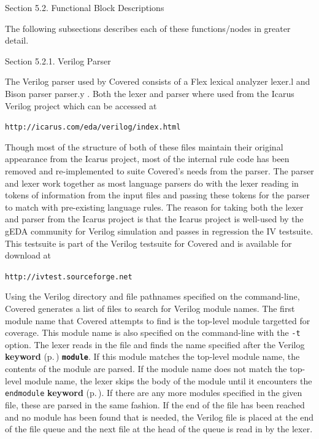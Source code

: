 \begin{Desc}
\item[Section 5.2.  Functional Block Descriptions]\par
 The following subsections describes each of these functions/nodes in greater detail.\end{Desc}
\begin{Desc}
\item[Section 5.2.1.  Verilog Parser]\par
 The Verilog parser used by Covered consists of a Flex lexical analyzer lexer.l and  Bison parser parser.y . Both the lexer and parser where used from the Icarus Verilog project which can be accessed at

 {\tt http://icarus.com/eda/verilog/index.html}

 Though most of the structure of both of these files maintain their original appearance from the Icarus project, most of the internal rule code has been removed and re-implemented to suite Covered's needs from the parser. The parser and lexer work together as most language parsers do with the lexer reading in tokens of information from the input files and passing these tokens for the parser to match with pre-existing language rules. The reason for taking both the lexer and parser from the Icarus project is that the Icarus project is well-used by the g\-EDA community for Verilog simulation and passes in regression the IV testsuite. This testsuite is part of the Verilog testsuite for Covered and is available for download at

 {\tt http://ivtest.sourceforge.net}

 Using the Verilog directory and file pathnames specified on the command-line, Covered generates a list of files to search for Verilog module names. The first module name that Covered attempts to find is the top-level module targetted for coverage. This module name is also specified on the command-line with the {\tt -t} option. The lexer reads in the file and finds the name specified after the Verilog {\bf keyword} {\rm (p.\,\pageref{structkeyword})} {\tt {\bf module}}. If this module matches the top-level module name, the contents of the module are parsed. If the module name does not match the top-level module name, the lexer skips the body of the module until it  encounters the {\tt endmodule} {\bf keyword} {\rm (p.\,\pageref{structkeyword})}. If there are any more modules specified in the given file, these are parsed in the same fashion. If the end of the file has been reached and no module has been found that is needed, the Verilog file is placed at the end of the file  queue and the next file at the head of the queue is read in by the lexer.


\end{Desc}
